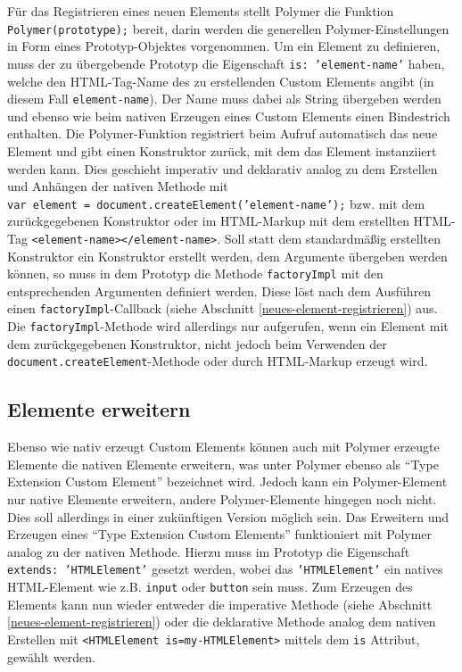Für das Registrieren eines neuen Elements stellt Polymer die Funktion \texttt{Polymer(prototype);} bereit, darin werden die generellen Polymer-Einstellungen in Form eines Prototyp-Objektes vorgenommen. Um ein Element zu definieren, muss der zu übergebende Prototyp die Eigenschaft \texttt{is: 'element-name'} haben, welche den \ac{HTML}-Tag-Name des zu erstellenden Custom Elements angibt (in diesem Fall \texttt{element-name}). Der Name muss dabei als String übergeben werden und ebenso wie beim nativen Erzeugen eines Custom Elements einen Bindestrich enthalten. Die Polymer-Funktion registriert beim Aufruf automatisch das neue Element und gibt einen Konstruktor zurück, mit dem das Element instanziiert werden kann. Dies geschieht imperativ und deklarativ analog zu dem Erstellen und Anhängen der nativen Methode mit \texttt{var\ element\ =\ document.createElement('element-name');} bzw. mit dem zurückgegebenen Konstruktor oder im \ac{HTML}-Markup mit dem erstellten \ac{HTML}-Tag \texttt{\textless{}element-name\textgreater{}\textless{}/element-name\textgreater{}}. Soll statt dem standardmäßig erstellten Konstruktor ein Konstruktor erstellt werden, dem Argumente übergeben werden können, so muss in dem Prototyp die Methode \texttt{factoryImpl} mit den entsprechenden Argumenten definiert werden. Diese löst nach dem Ausführen einen \texttt{factoryImpl}-Callback (siehe Abschnitt \ref{neues-element-registrieren}) aus. Die \texttt{factoryImpl}-Methode wird allerdings nur aufgerufen, wenn ein Element mit dem zurückgegebenen Konstruktor, nicht jedoch beim Verwenden der \texttt{document.createElement}-Methode oder durch \ac{HTML}-Markup erzeugt wird.


\subsection{Elemente erweitern}\label{elemente-erweitern}

Ebenso wie nativ erzeugt Custom Elements können auch mit Polymer erzeugte Elemente die nativen Elemente erweitern, was unter Polymer ebenso als ``Type Extension Custom Element'' bezeichnet wird. Jedoch kann ein Polymer-Element nur native Elemente erweitern, andere Polymer-Elemente hingegen noch nicht. Dies soll allerdings in einer zukünftigen Version möglich sein. Das Erweitern und Erzeugen eines ``Type Extension Custom Elements'' funktioniert mit Polymer analog zu der nativen Methode. Hierzu muss im Prototyp die Eigenschaft \texttt{extends:\ '\ac{HTML}Element'} gesetzt werden, wobei das \texttt{'\ac{HTML}Element'} ein natives \ac{HTML}-Element wie z.B. \texttt{input} oder \texttt{button} sein muss. Zum Erzeugen des Elements kann nun wieder entweder die imperative Methode (siehe Abschnitt \ref{neues-element-registrieren}) oder die deklarative Methode analog dem nativen Erstellen mit \texttt{\textless{}\ac{HTML}Element\ is=\dq my-\ac{HTML}Element\dq\textgreater{}} mittels dem \texttt{is} Attribut, gewählt werden.


